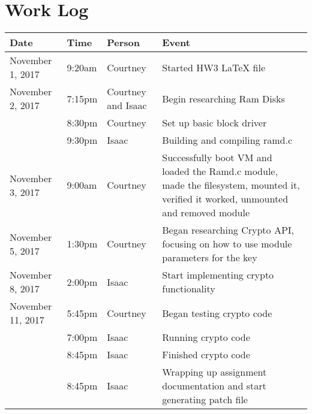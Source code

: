 \documentclass[letterpaper,10pt,draftclsnofoot,onecolumn,titlepage]{IEEEtran}
\begin{document}
\section{Work Log}
\begin{center}
\begin{tabular}{p{3cm}p{1cm}p{1cm}p{10cm} }
 Date  & Time & Person & Event \\ \hline
November 1, 2017 & 9:20am & Courtney & Started HW3 LaTeX file \\
November 2, 2017 & 7:15pm & Courtney and Isaac & Begin researching Ram Disks \\
		 & 8:30pm & Courtney & Set up basic block driver \\
		 & 9:30pm & Isaac & Building and compiling ramd.c \\
November 3, 2017 & 9:00am & Courtney & Successfully boot VM and loaded the Ramd.c module, made the filesystem, mounted it, verified it worked, unmounted and removed module \\
November 5, 2017 & 1:30pm & Courtney & Began researching Crypto API, focusing on how to use module parameters for the key \\
November 8, 2017 & 2:00pm & Isaac & Start implementing crypto functionality \\
November 11, 2017 & 5:45pm & Courtney & Began testing crypto code \\
		  & 7:00pm & Isaac & Running crypto code \\
   		  & 8:45pm & Isaac & Finished crypto code \\
   		  & 8:45pm & Isaac & Wrapping up assignment documentation and start generating patch file
\end{tabular}
\end{center}
\end{document}
